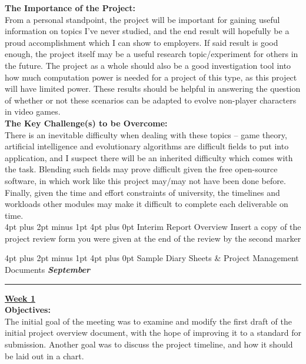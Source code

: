 \documentclass[12pt,a4paper]{article}
\makeatletter
\renewcommand\section{\@startsection {section}{1}{0mm}
                               {4pt plus 2pt minus 1pt}
                               {4pt plus 0pt}
                               {\bfseries}}
\makeatother
\begin{document}
\begin{appendices}
\textbf{The Importance of the Project:} \\
\newline
From a personal standpoint, the project will be important for gaining useful information on topics I’ve never studied, and the end result will hopefully be a proud accomplishment which I can show to employers. If said result is good enough, the project itself may be a useful research topic/experiment for others in the future. The project as a whole should also be a good investigation tool into how much computation power is needed for a project of this type, as this project will have limited power. These results should be helpful in answering the question of whether or not these scenarios can be adapted to evolve non-player characters in video games. \\

\textbf{The Key Challenge(s) to be Overcome:} \\
\newline
There is an inevitable difficulty when dealing with these topics – game theory, artificial intelligence and evolutionary algorithms are difficult fields to put into application, and I suspect there will be an inherited difficulty which comes with the task. Blending such fields may prove difficult given the free open-source software, in which work like this project may/may not have been done before. Finally, given the time and effort constraints of university, the timelines and workloads other modules may make it difficult to complete each deliverable on time. \\

\section{Interim Report Overview}
Insert a copy of the project review form you were given at the end of the review by the second marker

\section{Sample Diary Sheets \& Project Management Documents}
\textbf{\textit{September}}
\newline
\hrule
\textbf{\underline{Week 1}} \\
\newline
\textbf{Objectives:} \\
The initial goal of the meeting was to examine and modify the first draft of the initial project overview document, with the hope of improving it to a standard for submission. 
Another goal was to discuss the project timeline, and how it should be laid out in a chart. \\


\end{appendices}
\end{document}
